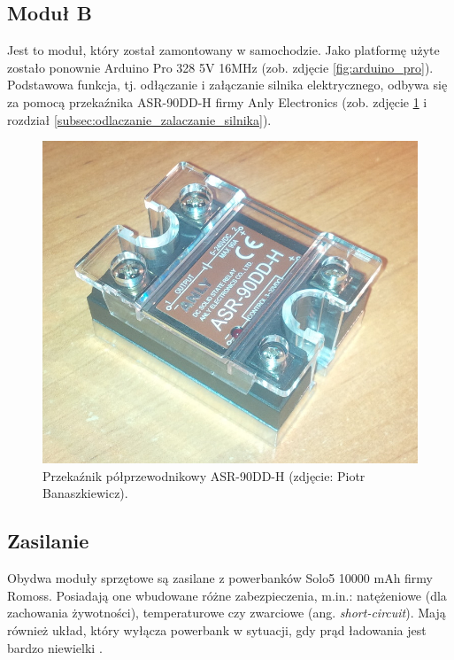 \raggedbottom

\subsection{Moduł B}
\label{subsec:modul_b}

Jest to moduł, który został zamontowany w samochodzie. Jako platformę użyte zostało ponownie Arduino Pro 328 5V 16MHz \cite{Ard00} (zob. zdjęcie \ref{fig:arduino_pro}). Podstawowa funkcja, tj. odłączanie i załączanie silnika elektrycznego, odbywa się za pomocą przekaźnika ASR-90DD-H firmy Anly Electronics (zob. zdjęcie \ref{fig:SSR_relay} i rozdział \ref{subsec:odlaczanie_zalaczanie_silnika}).

\begin{figure}[h]
	\centering
	\includegraphics[scale=0.3]{pics/Anly_ASR90DDH.jpg}
	\caption{\label{fig:SSR_relay}Przekaźnik półprzewodnikowy ASR-90DD-H  (zdjęcie: Piotr Banaszkiewicz).}
\end{figure}

\subsection{Zasilanie}
\label{subsec:zasilanie}

Obydwa moduły sprzętowe są zasilane z powerbanków Solo5 10000 mAh firmy Romoss. Posiadają one wbudowane różne zabezpieczenia, m.in.: natężeniowe (dla zachowania żywotności), temperaturowe czy zwarciowe (ang. \textit{short-circuit}). Mają również układ, który wyłącza powerbank w sytuacji, gdy prąd ładowania jest bardzo niewielki \cite{Romoss}.

